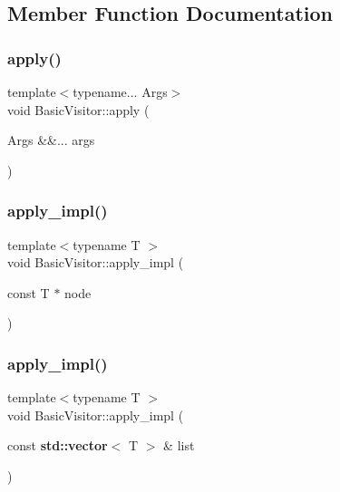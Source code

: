 \subsection{Member Function Documentation}
\mbox{\label{struct_basic_visitor_a85afee760b9e02733ed01ff56a96f09c}} 
\subsubsection{\texorpdfstring{apply()}{apply()}}
{\footnotesize\ttfamily template$<$typename... Args$>$ \\
void Basic\+Visitor\+::apply (\begin{DoxyParamCaption}\item[{Args \&\&...}]{args }\end{DoxyParamCaption})\hspace{0.3cm}{\ttfamily [inline]}}

\mbox{\label{struct_basic_visitor_aef8aa82a7e5149b6153f097af8daa647}} 
\subsubsection{\texorpdfstring{apply\+\_\+impl()}{apply\_impl()}\hspace{0.1cm}{\footnotesize\ttfamily [1/2]}}
{\footnotesize\ttfamily template$<$typename T $>$ \\
void Basic\+Visitor\+::apply\+\_\+impl (\begin{DoxyParamCaption}\item[{const T $\ast$}]{node }\end{DoxyParamCaption})\hspace{0.3cm}{\ttfamily [inline]}}

\mbox{\label{struct_basic_visitor_a128388a75069690c9c108ce87b69cde8}} 
\subsubsection{\texorpdfstring{apply\+\_\+impl()}{apply\_impl()}\hspace{0.1cm}{\footnotesize\ttfamily [2/2]}}
{\footnotesize\ttfamily template$<$typename T $>$ \\
void Basic\+Visitor\+::apply\+\_\+impl (\begin{DoxyParamCaption}\item[{const \textbf{ std\+::vector}$<$ T $>$ \&}]{list }\end{DoxyParamCaption})\hspace{0.3cm}{\ttfamily [inline]}}

